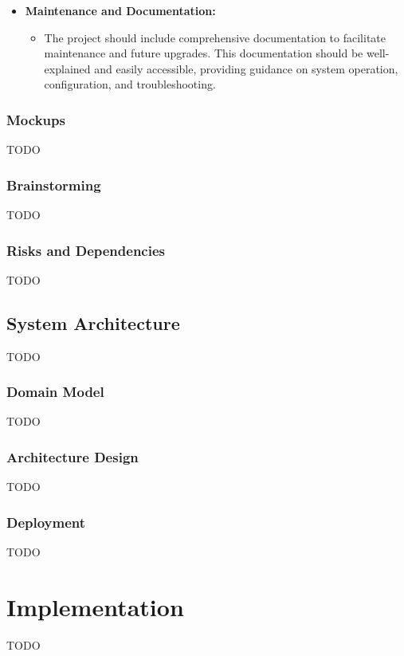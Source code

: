 \documentclass[a4paper,11pt]{article}
\begin{document}
\begin{itemize}
            \item \textbf{Maintenance and Documentation:} 
            \begin{itemize}
                \item The project should include comprehensive documentation to facilitate maintenance and future upgrades. This documentation should be well-explained and easily accessible, providing guidance on system operation, configuration, and troubleshooting.
            \end{itemize}
        \end{itemize}
        
    \subsubsection{Mockups}
        TODO
        
    \subsubsection{Brainstorming}
        TODO
        
    \subsubsection{Risks and Dependencies}
        TODO
        
    \vspace{0.5cm}
    \subsection{System Architecture}
        TODO
        
    \subsubsection{Domain Model}
        TODO
        
    \subsubsection{Architecture Design}
        TODO
        
    \subsubsection{Deployment}
        TODO

    \clearpage %
    \section{Implementation}\label{sec:implementation}
        TODO
        
\end{document}
